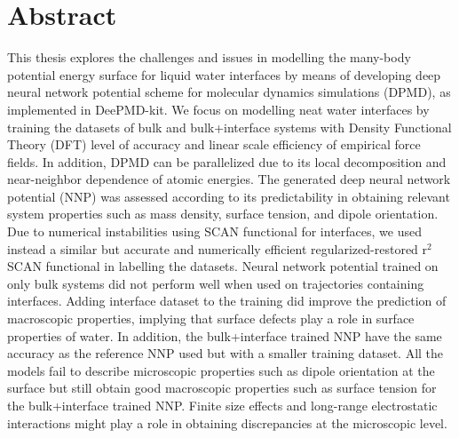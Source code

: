 \chapter*{Abstract}

This thesis explores the challenges and issues in modelling the many-body potential energy surface
for liquid water interfaces by means of developing deep neural network potential  scheme for molecular dynamics simulations (DPMD), as implemented in DeePMD-kit. We focus on modelling  neat water interfaces by training the datasets of bulk and bulk+interface systems with Density Functional Theory (DFT) level of accuracy and linear scale efficiency of empirical force fields. In addition, DPMD can be parallelized due to its local decomposition and  near-neighbor dependence of  atomic energies. The generated deep neural network potential (NNP) was assessed according to its predictability in obtaining relevant system properties such as mass density, surface tension, and dipole orientation. Due to numerical instabilities using SCAN functional for interfaces, we used instead a similar  but accurate and numerically efficient regularized-restored r$^2$SCAN functional in labelling the datasets. Neural network potential trained on only bulk
systems did not perform well when used on trajectories containing interfaces. Adding interface dataset to the training
did improve the prediction  of macroscopic properties, implying that surface defects
play a role in surface properties of water. In addition, the bulk+interface trained NNP have the same accuracy as the reference NNP used but with a smaller  training dataset. All the models  fail to describe microscopic properties such as dipole orientation at the surface but still obtain good macroscopic properties such as surface tension for the bulk+interface trained NNP.  Finite size effects  and  long-range electrostatic interactions might play a role in obtaining  discrepancies at the microscopic level.
